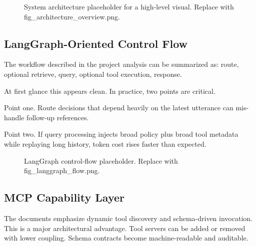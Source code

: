 \documentclass[conference]{IEEEtran}
\begin{document}
\begin{figure}[H]
\centering
{}
\caption{System architecture placeholder for a high-level visual. Replace with fig\_architecture\_overview.png.}
\label{fig:arch_overview}
\end{figure}

\subsection{LangGraph-Oriented Control Flow}

The workflow described in the project analysis can be summarized as:
route,
optional retrieve,
query,
optional tool execution,
response.

At first glance this appears clean.
In practice, two points are critical.

Point one.
Route decisions that depend heavily on the latest utterance can mis-handle follow-up references.

Point two.
If query processing injects broad policy plus broad tool metadata while replaying long history, token cost rises faster than expected.

\begin{figure}[H]
\centering
{}
\caption{LangGraph control-flow placeholder. Replace with fig\_langgraph\_flow.png.}
\label{fig:langgraph_flow}
\end{figure}

\subsection{MCP Capability Layer}

The documents emphasize dynamic tool discovery and schema-driven invocation.
This is a major architectural advantage.
Tool servers can be added or removed with lower coupling.
Schema contracts become machine-readable and auditable.
\end{document}
